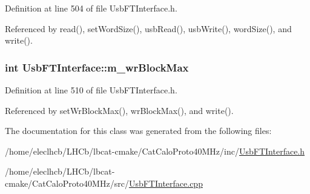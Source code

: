 Definition at line 504 of file UsbFTInterface.h.

Referenced by read(), setWordSize(), usbRead(), usbWrite(), wordSize(), and write().\hypertarget{classUsbFTInterface_ad0512841c67ea39da7701e990628059a}{
\subsubsection[{m\_\-wrBlockMax}]{\setlength{\rightskip}{0pt plus 5cm}int {\bf UsbFTInterface::m\_\-wrBlockMax}}}
\label{classUsbFTInterface_ad0512841c67ea39da7701e990628059a}


Definition at line 510 of file UsbFTInterface.h.

Referenced by setWrBlockMax(), wrBlockMax(), and write().

The documentation for this class was generated from the following files:\begin{DoxyCompactItemize}
\item 
/home/eleclhcb/LHCb/lbcat-\/cmake/CatCaloProto40MHz/inc/\hyperlink{UsbFTInterface_8h}{UsbFTInterface.h}\item 
/home/eleclhcb/LHCb/lbcat-\/cmake/CatCaloProto40MHz/src/\hyperlink{UsbFTInterface_8cpp}{UsbFTInterface.cpp}\end{DoxyCompactItemize}
